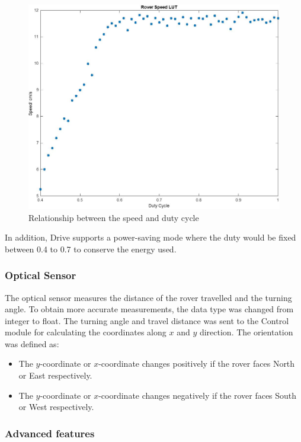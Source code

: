 \documentclass[11pt, a4paper]{article}
\begin{document}
\begin{figure} [h!]
    \centering
    \includegraphics[scale=0.4]{Speed_duty_cycle.jpg}
    \caption{Relationship between the speed and duty cycle}
    \label{fig:duty}
\end{figure}

In addition, Drive supports a power-saving mode where the duty would be fixed between 0.4 to 0.7 to conserve the energy used.

\subsubsection{Optical Sensor}

The optical sensor measures the distance of the rover travelled and the turning angle. To obtain more accurate measurements, the data type was changed from integer to float. The turning angle and travel distance was sent to the Control module for calculating the coordinates along $x$ and $y$ direction. The orientation was defined as:
\begin{itemize}
    \item The $y$-coordinate or $x$-coordinate changes positively if the rover faces North or East respectively.
    \item The $y$-coordinate or $x$-coordinate changes negatively if the rover faces South or West respectively.
\end{itemize}

\subsubsection{Advanced features}
\end{document}
